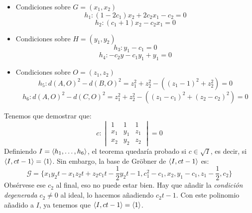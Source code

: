 \documentclass[twoside]{report}
\begin{document}
\begin{itemize}
\item Condiciones sobre $G=(x_1,x_2)$
\[ h_1 \colon (1-2c_1)x_2 + 2c_2x_1 - c_2 = 0 \]
\[ h_2 \colon (c_1+1)x_2 - c_2x_1 = 0 \]
\item Condiciones sobre $H = (y_1,y_2)$
\[ h_3 \colon y_1 - c_1 = 0 \]
\[ h_4 \colon -c_2 y - c_1 y_1 + y_1 = 0 \]
\item Condiciones sobre $O = (z_1,z_2)$
\[ h_5 \colon d(A,O)^2 - d(B,O)^2 = z_1^2+z_2^2 - \left((z_1-1)^2+z_2^2\right) = 0 \]
\[ h_6 \colon d(A,O)^2 - d(C,O)^2 = z_1^2+z_2^2 - \left((z_1-c_1)^2+(z_2-c_2)^2\right) = 0 \]
\end{itemize}
Tenemos que demostrar que:
\[ c \colon \begin{vmatrix}1 & 1 & 1\\x_1 & y_1 & z_1\\x_2 & y_2 & z_2\end{vmatrix} = 0\]
Definiendo $I = \langle{h_1,\dots,h_6}\rangle$, el teorema quedaría probado si $c \in \sqrt{I}$, es decir, si $\langle{I,ct-1}\rangle=\langle{1}\rangle$.
Sin embargo, la base de Gröbner de $\langle{I,ct-1}\rangle$ es:
\[ \mathcal{G} = \{x_1y_2t-x_1z_2t+z_2c_1t-\frac{1}{2}y_2t-1, c_1^2-c_1, x_2, y_1-c_1, z_1-\frac{1}{2},c_2 \}\]
Obsérvese ese $c_2$ al final, eso no puede estar bien.
Hay que añadir la \emph{condición degenerada} $c_2 \neq 0$ al ideal, lo hacemos añadiendo $c_2t-1$.
Con este polinomio añadido a $I$, ya tenemos que $\langle{I,ct-1}\rangle = \langle{1}\rangle$.
\end{document}
